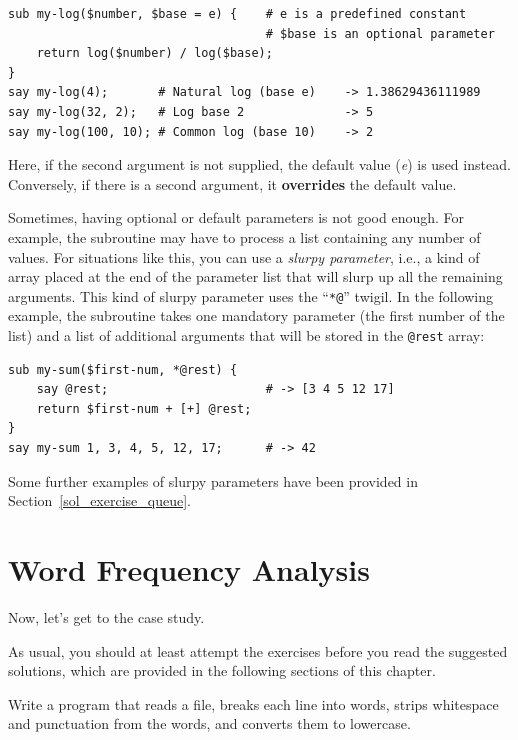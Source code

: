 \begin{verbatim}
sub my-log($number, $base = e) {    # e is a predefined constant
                                    # $base is an optional parameter
    return log($number) / log($base);
}
say my-log(4);       # Natural log (base e)    -> 1.38629436111989
say my-log(32, 2);   # Log base 2              -> 5
say my-log(100, 10); # Common log (base 10)    -> 2
\end{verbatim}

Here, if the second argument is not supplied, the default 
value (\emph{e}) is used instead. Conversely, if there 
is a second argument, it {\bf overrides} the default value.

\label{slurpy_parameters}
Sometimes, having optional or default parameters is not good 
enough. For example, the subroutine may have to process a list 
containing any number of values. For situations like this, 
you can use a \emph{slurpy parameter}, i.e., a kind of array 
placed at the end of the parameter list that will slurp up 
all the remaining arguments. This kind of slurpy parameter 
uses the ``\verb"*@"'' twigil. In the following example, 
the subroutine takes one mandatory parameter (the first 
number of the list) and a list of additional arguments 
that will be stored in the \verb'@rest' array:

\begin{verbatim}
sub my-sum($first-num, *@rest) {
    say @rest;                      # -> [3 4 5 12 17]
    return $first-num + [+] @rest;
}
say my-sum 1, 3, 4, 5, 12, 17;      # -> 42 
\end{verbatim}

Some further examples of slurpy parameters have been 
provided in Section~\ref{sol_exercise_queue}.

\section{Word Frequency Analysis}
\label{analysis}

Now, let's get to the case study.

As usual, you should at least attempt the exercises
before you read the suggested solutions, which are 
provided in the following sections of this chapter.

\begin{exercise}

Write a program that reads a file, breaks each line into
words, strips whitespace and punctuation from the words, and
converts them to lowercase.

\end{exercise}


